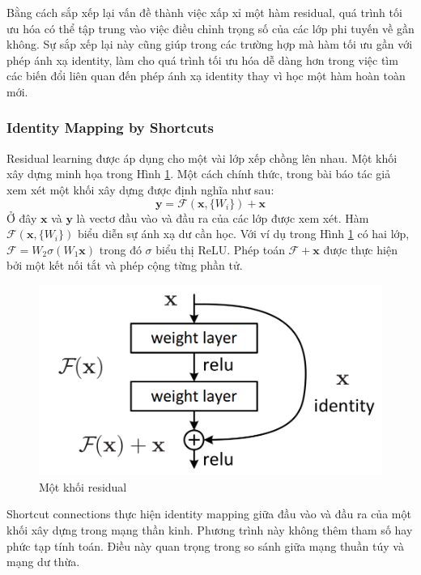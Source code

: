 Bằng cách sắp xếp lại vấn đề thành việc xấp xỉ một hàm residual, quá trình tối ưu hóa có thể tập trung vào việc điều chỉnh trọng số của các lớp phi tuyến về gần không. Sự sắp xếp lại này cũng giúp trong các trường hợp mà hàm tối ưu gần với phép ánh xạ identity, làm cho quá trình tối ưu hóa dễ dàng hơn trong việc tìm các biến đổi liên quan đến phép ánh xạ identity thay vì học một hàm hoàn toàn mới.

\subsubsection{Identity Mapping by Shortcuts}
Residual learning được áp dụng cho một vài lớp xếp chồng lên nhau. Một khối xây dựng minh họa trong Hình \ref{residual-block}. Một cách chính thức, trong bài báo \cite{he2015deep} tác giả xem xét một khối xây dựng được định nghĩa như sau: 
$$\mathbf{y} = \mathcal{F}(\mathbf{x}, \{W_i\}) + \mathbf{x}$$ 
Ở đây $\mathbf{x}$ và $\mathbf{y}$ là vectơ đầu vào và đầu ra của các lớp được xem xét. Hàm $\mathcal{F}(\mathbf{x}, \{W_i\})$ biểu diễn sự ánh xạ dư cần học. Với ví dụ trong Hình \ref{residual-block} có hai lớp, $\mathcal{F} = W_2 \sigma (W_1 \mathbf{x})$ trong đó $\sigma$ biểu thị ReLU. Phép toán $\mathcal{F} + \mathbf{x}$ được thực hiện bởi một kết nối tắt và phép cộng từng phần tử.

\begin{figure}[h]
    \includegraphics[scale=0.3]{images/residual_block.png}
    \centering
    \caption{Một khối residual}
    \label{residual-block}
\end{figure}

Shortcut connections thực hiện identity mapping giữa đầu vào và đầu ra của một khối xây dựng trong mạng thần kinh. Phương trình này không thêm tham số hay phức tạp tính toán. Điều này quan trọng trong so sánh giữa mạng thuần túy và mạng dư thừa. 

